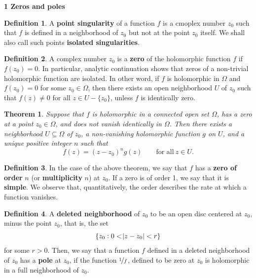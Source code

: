 \documentclass{article}
\newtheorem{theorem}{Theorem}
\theoremstyle{definition}
\newtheorem{definition}{Definition}[section]
\theoremstyle{remark}
\begin{document}
    \textbf{1 Zeros and poles}\\
    \begin{definition}
        A \textbf{point singularity} of a function $f$ is a cmoplex number $z_0$ such that $f$ is defined in a neighborhood of $z_0$
        but not at the point $z_0$ itself. We shall also call such points \textbf{isolated singularities}.
    \end{definition}

    \begin{definition}
        A complex number $z_0$ is a \textbf{zero} of the holomorphic function $f$ if $f(z_0) = 0$. In particular, analytic continuation
        shows that zeros of a non-trivial holomorphic function are isolated. In other word, if $f$ is holomorphic in $\Omega$ and
        $f(z_0) = 0$ for some $z_0\in\Omega$, then there exists an open neighborhood $U$ of $z_0$ such that $f(z)\neq 0$ for all
        $z\in U-\{z_0\}$, unless $f$ is identically zero.
    \end{definition}

    \begin{theorem}
        Suppose that $f$ is holomorphic in a connected open set $\Omega$, has a zero at a point $z_0\in\Omega$, and does not vanish
        identically in $\Omega$. Then there exists a neighborhood $U\subseteq \Omega$ of $z_0$, a non-vanishing holomorphic
        function $g$ on $U$, and a unique positive integer $n$ such that
        \[ f(z) = (z-z_0)^ng(z)\qquad\text{for all}\:z\in U. \]
    \end{theorem}

    \begin{definition}
        In the case of the above theorem, we say that $f$ has a \textbf{zero of order} $n$ (or \textbf{multiplicity} $n$) at $z_0$.
        If a zero is of order 1, we say that it is \textbf{simple}. We observe that, quantitatively, the order describes the rate
        at which a function vanishes.
    \end{definition}

    \begin{definition}
        A \textbf{deleted neighborhood} of $z_0$ to be an open disc centered at $z_0$, minus the point $z_0$, that is, the set
        \[ \{z_0: 0 < \abs{z-z_0} < r\} \]
        for some $r>0$. Then, we say that a function $f$ defined in a deleted neighborhood of $z_0$ has a \textbf{pole} at $z_0$,
        if the function $\nicefrac{1}{f}$, defined to be zero at $z_0$ is holomorphic in a full neighborhood of $z_0$.
    \end{definition}
\end{document}
